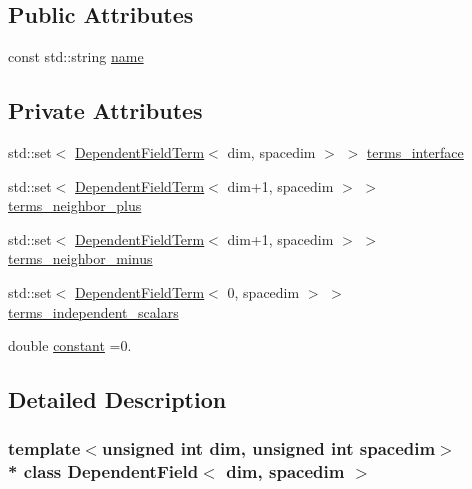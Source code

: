 \subsection*{Public Attributes}
\begin{DoxyCompactItemize}
\item 
const std\+::string \hyperlink{class_dependent_field_a698b255f131279d1edb97b3c525153a0}{name}
\end{DoxyCompactItemize}
\subsection*{Private Attributes}
\begin{DoxyCompactItemize}
\item 
std\+::set$<$ \hyperlink{class_dependent_field_term}{Dependent\+Field\+Term}$<$ dim, spacedim $>$ $>$ \hyperlink{class_dependent_field_aa6326d64fd7828c935946136ec5ec122}{terms\+\_\+interface}
\item 
std\+::set$<$ \hyperlink{class_dependent_field_term}{Dependent\+Field\+Term}$<$ dim+1, spacedim $>$ $>$ \hyperlink{class_dependent_field_a05ba04a9f0f50fd881055f3abf46c9f5}{terms\+\_\+neighbor\+\_\+plus}
\item 
std\+::set$<$ \hyperlink{class_dependent_field_term}{Dependent\+Field\+Term}$<$ dim+1, spacedim $>$ $>$ \hyperlink{class_dependent_field_a9ac1d390137d52ef6c58b230d540ce38}{terms\+\_\+neighbor\+\_\+minus}
\item 
std\+::set$<$ \hyperlink{class_dependent_field_term}{Dependent\+Field\+Term}$<$ 0, spacedim $>$ $>$ \hyperlink{class_dependent_field_aa1ba265eae76489d22d3eecd595931c5}{terms\+\_\+independent\+\_\+scalars}
\item 
double \hyperlink{class_dependent_field_a32b37c78e04a16b6b606442f156c8ca9}{constant} =0.
\end{DoxyCompactItemize}


\subsection{Detailed Description}
\subsubsection*{template$<$unsigned int dim, unsigned int spacedim$>$\\*
class Dependent\+Field$<$ dim, spacedim $>$}

